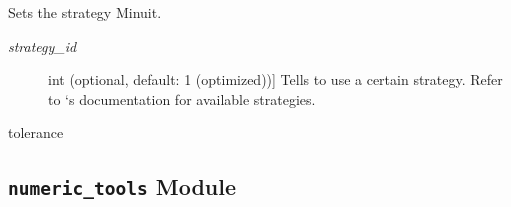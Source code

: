 \documentclass[a4paper,10pt,english]{sphinxmanual}
\begin{document}
\begin{fulllineitems}
\begin{fulllineitems}
\begin{description}
\end{description}

\end{fulllineitems}


\begin{fulllineitems}
\label{index:kafe.minuit.Minuit.set_strategy}
Sets the strategy Minuit.
\begin{description}
\item[{\emph{strategy\_id}}] \leavevmode{[}int (optional, default: 1 (optimized)){]}
Tells  to use a certain strategy. Refer to `s
documentation for available strategies.

\end{description}

\end{fulllineitems}


\begin{fulllineitems}
\label{index:kafe.minuit.Minuit.tolerance}
 tolerance

\end{fulllineitems}


\end{fulllineitems}



\subsection{\texttt{numeric\_tools} Module}
\label{index:module-kafe.numeric_tools}\label{index:numeric-tools-module}\label{index:module-numeric_tools}
\end{document}
